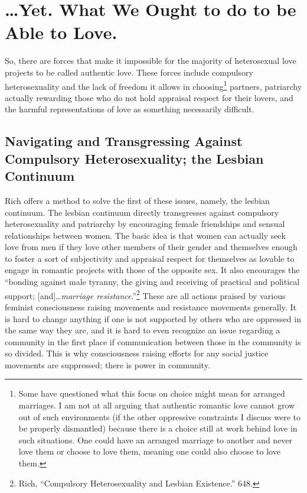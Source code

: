 \section{\ldots Yet. What We Ought to do to be Able to Love.}

So, there are forces that make it impossible for the majority of
heterosexual love projects to be called authentic love. These forces
include compulsory heterosexuality and the lack of freedom it allows in
choosing\footnote{Some have questioned what this focus on choice might
  mean for arranged marriages. I am not at all arguing that authentic
  romantic love cannot grow out of such environments (if the other
  oppressive constraints I discuss were to be properly dismantled)
  because there is a choice still at work behind love in such
  situations. One could have an arranged marriage to another and never
  love them or choose to love them, meaning one could also choose to
  love them.} partners, patriarchy actually rewarding those who do not
hold appraisal respect for their lovers, and the harmful representations
of love as something necessarily difficult.

\subsection{Navigating and Transgressing Against Compulsory
Heterosexuality; the Lesbian Continuum}

Rich offers a method to solve the first of these issues, namely, the
lesbian continuum. The lesbian continuum directly transgresses against
compulsory heterosexuality and patriarchy by encouraging female
friendships and sensual relationships between women. The basic idea is
that women can actually seek love from men if they love other members of
their gender and themselves enough to foster a sort of subjectivity and
appraisal respect for themselves as lovable to engage in romantic
projects with those of the opposite sex. It also encourages the
``bonding against male tyranny, the giving and receiving of practical
and political support; [and]\ldots\emph{marriage
resistance}.''\footnote{Rich, ``Compulsory Heterosexuality and Lesbian
  Existence.'' 648.} These are all actions praised by various feminist
consciousness raising movements and resistance movements generally. It
is hard to change anything if one is not supported by others who are
oppressed in the same way they are, and it is hard to even recognize an
issue regarding a community in the first place if communication between
those in the community is so divided. This is why consciousness raising
efforts for any social justice movements are suppressed; there is power
in community.

